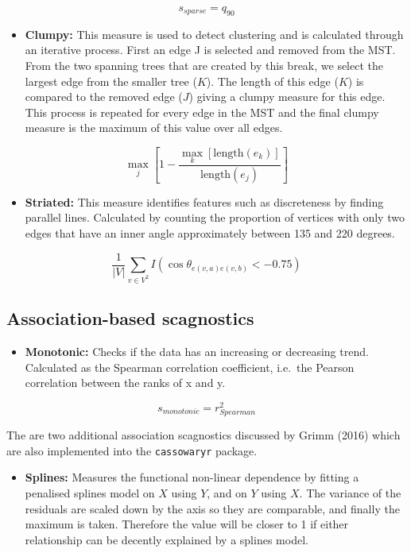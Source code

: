 \[s_{sparse}= q_{90}\]

\begin{itemize}
\tightlist
\item
  \textbf{Clumpy:} This measure is used to detect clustering and is calculated through an iterative process. First an edge J is selected and removed from the MST. From the two spanning trees that are created by this break, we select the largest edge from the smaller tree (\(K\)). The length of this edge (\(K\)) is compared to the removed edge (\(J\)) giving a clumpy measure for this edge. This process is repeated for every edge in the MST and the final clumpy measure is the maximum of this value over all edges.
\end{itemize}

\[\max_{j}\left[ 1-\frac{\max_{k}[\mbox{length}(e_k)]}{\mbox{length}(e_j)}\right]\]

\begin{itemize}
\tightlist
\item
  \textbf{Striated:} This measure identifies features such as discreteness by finding parallel lines. Calculated by counting the proportion of vertices with only two edges that have an inner angle approximately between 135 and 220 degrees.
\end{itemize}

\[\frac1{|V|}\sum_{v \in V^{2}}I(\cos\theta_{e(v,a)e(v,b)}<-0.75)\]

\hypertarget{association-based-scagnostics}{%
\subsection{Association-based scagnostics}\label{association-based-scagnostics}}

\begin{itemize}
\tightlist
\item
  \textbf{Monotonic:} Checks if the data has an increasing or decreasing trend. Calculated as the Spearman correlation coefficient, i.e.~the Pearson correlation between the ranks of x and y.
\end{itemize}

\[s_{monotonic} = r^2_{Spearman}\]

The are two additional association scagnostics discussed by Grimm (2016) which are also implemented into the \texttt{cassowaryr} package.

\begin{itemize}
\tightlist
\item
  \textbf{Splines:} Measures the functional non-linear dependence by fitting a penalised splines model on \(X\) using \(Y\), and on \(Y\) using \(X\). The variance of the residuals are scaled down by the axis so they are comparable, and finally the maximum is taken. Therefore the value will be closer to 1 if either relationship can be decently explained by a splines model.
\end{itemize}

